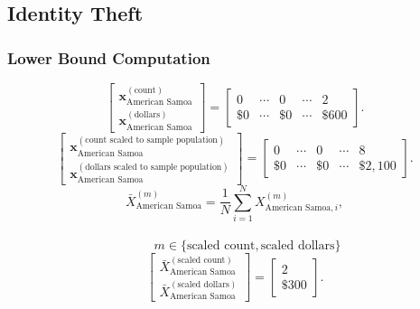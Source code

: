 \newpage
\subsection{Identity Theft}
\subsubsection{Lower Bound Computation}
\[
\begin{bmatrix}
\mathbf{x}_{\text{American Samoa}}^{(\text{count})}\\
\mathbf{x}_{\text{American Samoa}}^{(\text{dollars})}
\end{bmatrix}
=
\begin{bmatrix}
0 & \cdots & 0 & \cdots & 2\\
\$0 & \cdots & \$0 & \cdots & \$600
\end{bmatrix}.
\]
\[
\begin{bmatrix}
\mathbf{x}_{\text{American Samoa}}^{(\text{count scaled to sample population})}\\
\mathbf{x}_{\text{American Samoa}}^{(\text{dollars scaled to sample population})}
\end{bmatrix}
=
\begin{bmatrix}
0 & \cdots & 0 & \cdots & 8\\
\$0 & \cdots & \$0 & \cdots & \$2{,}100
\end{bmatrix}.
\]
  \[
\bar{X}_{\text{American Samoa}}^{(m)}
= \frac{1}{N}\sum_{i=1}^{N} X_{\text{American Samoa},i}^{(m)},
\]
\\
\[
\qquad
m \in \{\text{scaled count},\text{scaled dollars}\}
\]
\[
\begin{bmatrix}
\bar{X}_{\text{American Samoa}}^{(\text{scaled count})}\\
\bar{X}_{\text{American Samoa}}^{(\text{scaled dollars})}
\end{bmatrix}
=
\begin{bmatrix}
2\\
\$300
\end{bmatrix}.
\]
